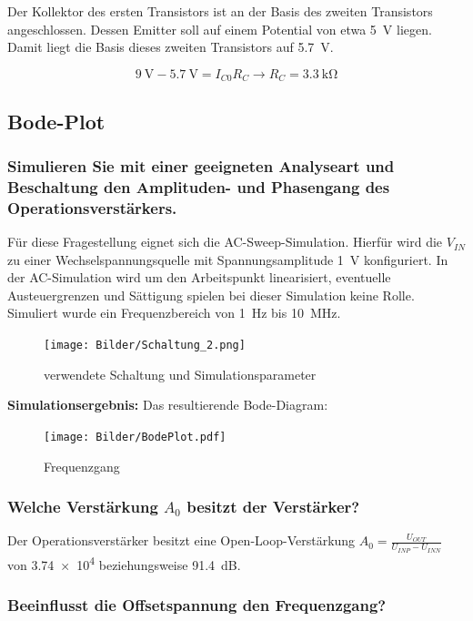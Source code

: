 Der Kollektor des ersten Transistors ist an der Basis des zweiten Transistors angeschlossen. Dessen Emitter soll auf einem Potential von etwa \SI{5}{\volt} liegen. Damit liegt die Basis dieses zweiten Transistors auf \SI{5.7}{\volt}.

\begin{equation*}
    \SI{9}{\volt} - \SI{5.7}{\volt} = I_{C0} R_C \rightarrow R_C = \SI{3.3}{\kilo \ohm}
\end{equation*}
\subsection{Bode-Plot}
\subsubsection{Simulieren Sie mit einer geeigneten Analyseart und Beschaltung den Amplituden- und Phasengang des Operationsverstärkers.}

Für diese Fragestellung eignet sich die AC-Sweep-Simulation. Hierfür wird die $V_{IN}$ zu einer Wechselspannungsquelle mit Spannungsamplitude \SI{1}{\volt} konfiguriert. In der AC-Simulation wird um den Arbeitspunkt linearisiert, eventuelle Austeuergrenzen und Sättigung spielen bei dieser Simulation keine Rolle. Simuliert wurde ein Frequenzbereich von \SI{1}{Hz} bis \SI{10}{\mega \hertz}.

\begin{figure}[H]
    \centering
    \texttt{[image: Bilder/Schaltung\_2.png]}
    \caption{verwendete Schaltung und Simulationsparameter}
    \label{fig:my_label}
\end{figure}

\textbf{Simulationsergebnis:} Das resultierende Bode-Diagram:
\begin{figure}[H]
    \centering
    \texttt{[image: Bilder/BodePlot.pdf]}
    \caption{Frequenzgang}
    \label{fig:my_label}
\end{figure}

\subsubsection{Welche Verstärkung $A_0$ besitzt der Verstärker?}

Der Operationsverstärker besitzt eine Open-Loop-Verstärkung $A_0 = \frac{U_{OUT}}{U_{INP}-U_{INN}}$ von \num{3.74e4} beziehungsweise \SI{91.4}{dB}.

\subsubsection{Beeinflusst die Offsetspannung den Frequenzgang?}

